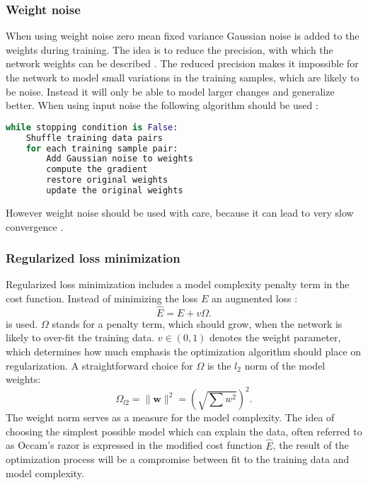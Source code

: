 \subsubsection{Weight noise}
When using weight noise zero mean fixed variance Gaussian noise is added to the weights during training. The idea is to reduce the precision, with which the network weights can be described \cite[page 32]{Graves2012}. The reduced precision makes it impossible for the network to model small variations in the training samples, which are likely to be noise. Instead it will only be able to model larger changes and generalize better.
When using input noise the following algorithm should be used \cite[page 33]{Graves2012}:
\begin{lstlisting}[language=python]
while stopping condition is False:
    Shuffle training data pairs
    for each training sample pair:
        Add Gaussian noise to weights
        compute the gradient
        restore original weights
        update the original weights
\end{lstlisting}
However weight noise should be used with care, because it can lead to very slow convergence \cite[page 32]{Graves2012}.

\subsubsection{Regularized loss minimization}
Regularized loss minimization includes a model complexity penalty term in the cost function. Instead of minimizing the loss $E$ an augmented loss \cite[p. 338]{Bishop1995}\cite[p. 171]{Ben-david2014}:
\begin{equation}
\hat{E} = E + v\Omega.
\end{equation}
is used. $\Omega$ stands for a penalty term, which should grow, when the network is likely to over-fit the training data. $v \in (0,1)$ denotes the weight parameter, which determines how much emphasis the optimization algorithm should place on regularization. A straightforward choice for $\Omega$ is the $l_2$ norm of the model weights:
\begin{equation}
\Omega_{l2} = \|\mathbf{w}\|^2 = (\sqrt{ \sum w^2})^2.
\end{equation}
The weight norm serves as a measure for the model complexity. The idea of choosing the simplest possible model which can explain the data, often referred to as Occam's razor is expressed in the modified cost function $\hat{E}$, the result of the optimization process will be a compromise between fit to the training data and model complexity.


